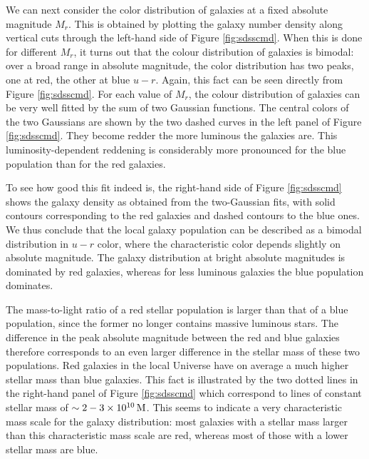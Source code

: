 \documentclass[a4paper,10pt]{article}
\begin{document}
{\noindent}We can next consider the color distribution of galaxies at a fixed absolute magnitude $M_r$. This is obtained by plotting the galaxy number density along vertical cuts through the left-hand side of Figure \ref{fig:sdsscmd}. When this is done for different $M_r$, it turns out that the colour distribution of galaxies is bimodal: over a broad range in absolute magnitude, the color distribution has two peaks, one at red, the other at blue $u-r$. Again, this fact can be seen directly from Figure \ref{fig:sdsscmd}. For each value of $M_r$, the colour distribution of galaxies can be very well fitted by the sum of two Gaussian functions. The central colors of the two Gaussians are shown by the two dashed curves in the left panel of Figure \ref{fig:sdsscmd}. They become redder the more luminous the galaxies are. This luminosity-dependent reddening is considerably more pronounced for the blue population than for the red galaxies.

{\noindent}To see how good this fit indeed is, the right-hand side of Figure \ref{fig:sdsscmd} shows the galaxy density as obtained from the two-Gaussian fits, with solid contours corresponding to the red galaxies and dashed contours to the blue ones. We thus conclude that the local galaxy population can be described as a bimodal distribution in $u-r$ color, where the characteristic color depends slightly on absolute magnitude. The galaxy distribution at bright absolute magnitudes is dominated by red galaxies, whereas for less luminous galaxies the blue population dominates.

{\noindent}The mass-to-light ratio of a red stellar population is larger than that of a blue population, since the former no longer contains massive luminous stars. The difference in the peak absolute magnitude between the red and blue galaxies therefore corresponds to an even larger difference in the stellar mass of these two populations. Red galaxies in the local Universe have on average a much higher stellar mass than blue galaxies. This fact is illustrated by the two dotted lines in the right-hand panel of Figure \ref{fig:sdsscmd} which correspond to lines of constant stellar mass of $\sim2-3\times10^{10}\,{\rm M}$. This seems to indicate a very characteristic mass scale for the galaxy distribution: most galaxies with a stellar mass larger than this characteristic mass scale are red, whereas most of those with a lower stellar mass are blue.
\end{document}
